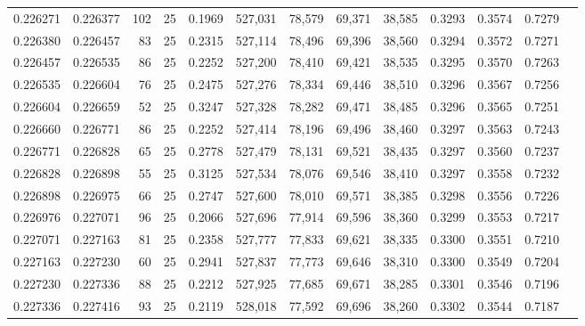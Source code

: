 \begin{tabular}{rrrrrrrrrrrrr}
0.226271 & 0.226377 &   102 &  25 &                                     0.1969 & 527,031 &  78,579 &  69,371 &  38,585 & 0.3293 & 0.3574 & 0.7279 \\
0.226380 & 0.226457 &    83 &  25 &                                     0.2315 & 527,114 &  78,496 &  69,396 &  38,560 & 0.3294 & 0.3572 & 0.7271 \\
0.226457 & 0.226535 &    86 &  25 &                                     0.2252 & 527,200 &  78,410 &  69,421 &  38,535 & 0.3295 & 0.3570 & 0.7263 \\
0.226535 & 0.226604 &    76 &  25 &                                     0.2475 & 527,276 &  78,334 &  69,446 &  38,510 & 0.3296 & 0.3567 & 0.7256 \\
0.226604 & 0.226659 &    52 &  25 &                                     0.3247 & 527,328 &  78,282 &  69,471 &  38,485 & 0.3296 & 0.3565 & 0.7251 \\
0.226660 & 0.226771 &    86 &  25 &                                     0.2252 & 527,414 &  78,196 &  69,496 &  38,460 & 0.3297 & 0.3563 & 0.7243 \\
0.226771 & 0.226828 &    65 &  25 &                                     0.2778 & 527,479 &  78,131 &  69,521 &  38,435 & 0.3297 & 0.3560 & 0.7237 \\
0.226828 & 0.226898 &    55 &  25 &                                     0.3125 & 527,534 &  78,076 &  69,546 &  38,410 & 0.3297 & 0.3558 & 0.7232 \\
0.226898 & 0.226975 &    66 &  25 &                                     0.2747 & 527,600 &  78,010 &  69,571 &  38,385 & 0.3298 & 0.3556 & 0.7226 \\
0.226976 & 0.227071 &    96 &  25 &                                     0.2066 & 527,696 &  77,914 &  69,596 &  38,360 & 0.3299 & 0.3553 & 0.7217 \\
0.227071 & 0.227163 &    81 &  25 &                                     0.2358 & 527,777 &  77,833 &  69,621 &  38,335 & 0.3300 & 0.3551 & 0.7210 \\
0.227163 & 0.227230 &    60 &  25 &                                     0.2941 & 527,837 &  77,773 &  69,646 &  38,310 & 0.3300 & 0.3549 & 0.7204 \\
0.227230 & 0.227336 &    88 &  25 &                                     0.2212 & 527,925 &  77,685 &  69,671 &  38,285 & 0.3301 & 0.3546 & 0.7196 \\
0.227336 & 0.227416 &    93 &  25 &                                     0.2119 & 528,018 &  77,592 &  69,696 &  38,260 & 0.3302 & 0.3544 & 0.7187 \\

\end{tabular}
